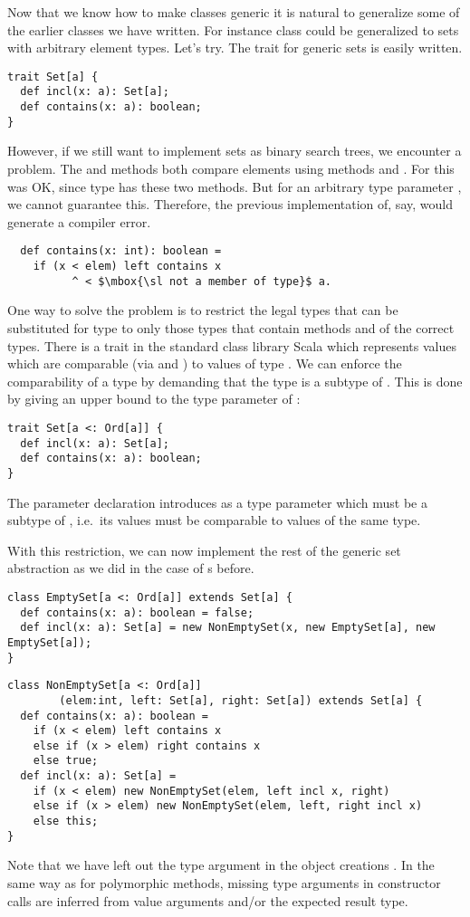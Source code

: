 \documentclass[a4paper,12pt,twoside,titlepage]{book}
\begin{document}
Now that we know how to make classes generic it is natural to
generalize some of the earlier classes we have written. For instance
class  could be generalized to sets with arbitrary
element types. Let's try. The trait for generic sets is easily
written.
\begin{lstlisting}
trait Set[a] { 
  def incl(x: a): Set[a]; 
  def contains(x: a): boolean; 
}
\end{lstlisting}
However, if we still want to implement sets as binary search trees, we
encounter a problem. The  and  methods both
compare elements using methods \code{<} and \code{>}. For
 this was OK, since type  has these two
methods. But for an arbitrary type parameter , we cannot
guarantee this. Therefore, the previous implementation of, say,
 would generate a compiler error.
\begin{lstlisting}
  def contains(x: int): boolean = 
    if (x < elem) left contains x
          ^ < $\mbox{\sl not a member of type}$ a.
\end{lstlisting}
One way to solve the problem is to restrict the legal types that can
be substituted for type  to only those types that contain methods
\code{<} and \code{>} of the correct types. There is a trait
 in the standard class library Scala which represents
values which are comparable (via \code{<} and \code{>}) to values of
type . We can enforce the comparability of a type by demanding
that the type is a subtype of . This is done by giving an
upper bound to the type parameter of :
\begin{lstlisting}
trait Set[a <: Ord[a]] { 
  def incl(x: a): Set[a]; 
  def contains(x: a): boolean; 
}
\end{lstlisting}
The parameter declaration  introduces  as a
type parameter which must be a subtype of , i.e.\ its values
must be comparable to values of the same type.

With this restriction, we can now implement the rest of the generic
set abstraction as we did in the case of s before.

\begin{lstlisting}
class EmptySet[a <: Ord[a]] extends Set[a] {
  def contains(x: a): boolean = false;
  def incl(x: a): Set[a] = new NonEmptySet(x, new EmptySet[a], new EmptySet[a]);
}
\end{lstlisting}

\begin{lstlisting}
class NonEmptySet[a <: Ord[a]]
        (elem:int, left: Set[a], right: Set[a]) extends Set[a] {
  def contains(x: a): boolean = 
    if (x < elem) left contains x
    else if (x > elem) right contains x
    else true;
  def incl(x: a): Set[a] = 
    if (x < elem) new NonEmptySet(elem, left incl x, right)
    else if (x > elem) new NonEmptySet(elem, left, right incl x)
    else this;
}
\end{lstlisting}
Note that we have left out the type argument in the object creations
. In the same way as for polymorphic methods,
missing type arguments in constructor calls are inferred from value
arguments and/or the expected result type.
\end{document}
